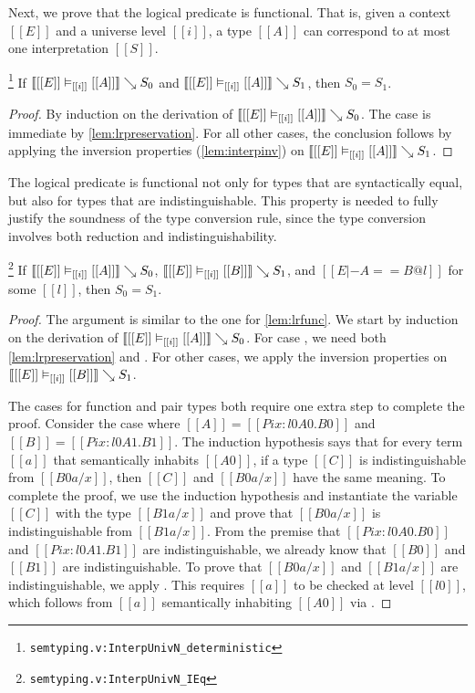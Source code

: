 \documentclass[acmsmall, screen=true, nonacm=true,
  review=\ifpublic false\else true\fi,
  anonymous=\ifanonymous true\else false\fi
]{acmart}
\DeclarePairedDelimiter{\bracks}{\llbracket}{\rrbracket}
\newcommand{\suppl}[3]{{\scriptsize\texttt{#2:#3}}}
\newcommand{\interp}[4]{\bracks{#1 \vDash_{#2} #3} \searrow #4}
\newlength{\punctwidth}
\newcommand{\stack}[1]{%
  \settowidth{\punctwidth}{#1}%
  \hspace*{-\the\punctwidth}%
}
\begin{document}
Next, we prove that the logical predicate is functional. That is,
given a context $[[E]]$ and a universe level $[[i]]$, a type $[[A]]$
can correspond to at most one interpretation $[[S]]$.

\begin{lemma}[Functionality]
\stack{.~}\footnote{\suppl{theories}{semtyping.v}{InterpUnivN\_deterministic}}
\label{lem:lrfunc}
If $\interp{[[E]]}{[[i]]}{[[A]]}{S_0}$ and
$\interp{[[E]]}{[[i]]}{[[A]]}{S_1}$, then $S_0 = S_1$.
\end{lemma}

\begin{proof}
  By induction on the derivation of
  $\interp{[[E]]}{[[i]]}{[[A]]}{S_0}$.
  The  case is immediate by \cref{lem:lrpreservation}.
  For all other cases, the conclusion
  follows by applying the inversion
  properties (\cref{lem:interpinv}) on
  $\interp{[[E]]}{[[i]]}{[[A]]}{S_1}$.
\end{proof}

The logical predicate is functional not only for types that are
syntactically equal, but also for types that are
indistinguishable. This property is needed to fully justify the
soundness of the type conversion rule, since the type conversion
involves both reduction and indistinguishability.

\begin{lemma}
  \label{lem:lrfunci}
  \stack{.~}\footnote{\suppl{theories}{semtyping.v}{InterpUnivN\_IEq}}
  If $\interp{[[E]]}{[[i]]}{[[A]]}{S_0}$,
  $\interp{[[E]]}{[[i]]}{[[B]]}{S_1}$, and
  $[[E |- A == B @ l ]]$ for some $[[l]]$,
  then $S_0 = S_1$.
\end{lemma}

\begin{proof}
  The argument is similar to the one for \cref{lem:lrfunc}.
  We start by induction on the derivation of
  $\interp{[[E]]}{[[i]]}{[[A]]}{S_0}$.
  For case , we need both \cref{lem:lrpreservation}
  and .
  For other cases, we apply the inversion properties on
  $\interp{[[E]]}{[[i]]}{[[B]]}{S_1}$.

  The cases for function and pair types both require one extra step to complete the
  proof. Consider the case where $[[A]] = [[Pi x : l0 A0 . B0]]$ and
  $[[B]] = [[Pi x : l0 A1 . B1]]$. The
  induction hypothesis says that for every term $[[a]]$ that
  semantically inhabits $[[A0]]$, if a type $[[C]]$ is
  indistinguishable from $[[B0 {a / x}]]$, then $[[C]]$ and $[[B0 {a /
  x}]]$ have the same meaning. To complete the proof, we use
  the induction hypothesis and instantiate the variable
  $[[C]]$ with the type $[[B1 { a / x}]]$ and prove that $[[B0 {a /
    x}]]$ is indistinguishable from $[[B1 {a / x}]]$.  From the
  premise that $[[Pi x : l0 A0 . B0]]$ and $[[Pi x : l0 A1 . B1]]$ are
  indistinguishable, we already know that $[[B0]]$ and $[[B1]]$ are
  indistinguishable.
  To prove that $[[B0 {a / x}]]$ and $[[B1 {a / x}]]$ are
  indistinguishable, we apply .
  This requires $[[a]]$ to be checked at level $[[l0]]$,
  which follows from $[[a]]$ semantically inhabiting $[[A0]]$ via .
\end{proof}
\end{document}
